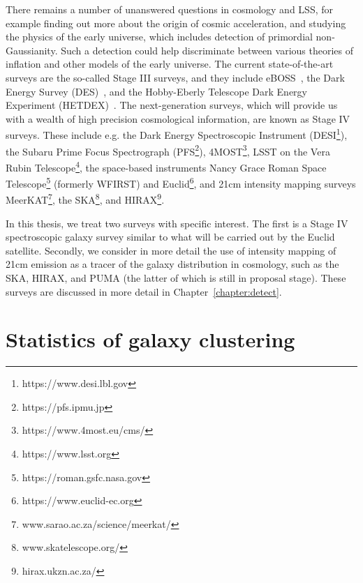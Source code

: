 There remains a number of unanswered questions in cosmology and LSS, for example finding out more about the origin of cosmic acceleration, and studying the physics of the early universe, which includes detection of primordial non-Gaussianity. Such a detection could help discriminate between various theories of inflation and other models of the early universe. The current state-of-the-art surveys are the so-called Stage III surveys, and they include eBOSS~\cite{Dawson:2015wdb}, the Dark Energy Survey (DES)~\cite{DES:2014xto}, and the Hobby-Eberly Telescope Dark Energy Experiment (HETDEX)~\cite{Hill:2008}. 
The next-generation surveys, which will provide us with a wealth of high precision cosmological information, are known as Stage IV surveys. These include e.g. the Dark Energy Spectroscopic Instrument (DESI\footnote{https://www.desi.lbl.gov}), the Subaru Prime Focus Spectrograph (PFS\footnote{https://pfs.ipmu.jp}), 4MOST\footnote{https://www.4most.eu/cms/}, LSST on the Vera Rubin Telescope\footnote{https://www.lsst.org}, the space-based instruments Nancy Grace Roman Space Telescope\footnote{https://roman.gsfc.nasa.gov} (formerly WFIRST) and Euclid\footnote{https://www.euclid-ec.org}, and 21cm intensity mapping surveys MeerKAT\footnote{www.sarao.ac.za/science/meerkat/}, the SKA\footnote{{www.skatelescope.org/}}, and HIRAX\footnote{hirax.ukzn.ac.za/}. 

In this thesis, we treat two surveys with specific interest. The first is a Stage IV spectroscopic galaxy survey similar to what will be carried out by the Euclid satellite. Secondly, we consider in more detail the use of intensity mapping of 21cm emission as a tracer of the galaxy distribution in cosmology, such as the SKA, HIRAX, and PUMA (the latter of which is still in proposal stage). These surveys are discussed in more detail in Chapter~\ref{chapter:detect}. 


\section{Statistics of galaxy clustering}
\label{section:introbisp} 

